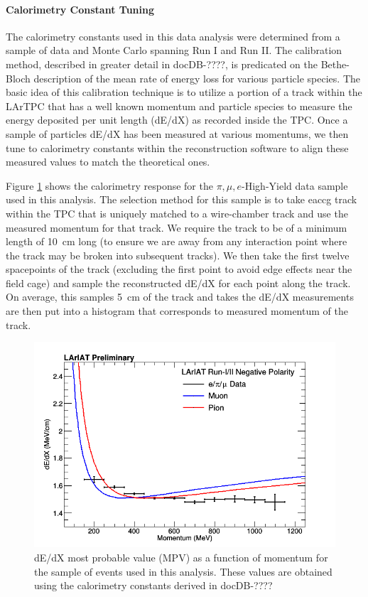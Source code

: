 \paragraph{\textbf{Calorimetry Constant Tuning}}
The calorimetry constants used in this data analysis were determined from a sample of data and Monte Carlo spanning Run I and Run II. The calibration method, described in greater detail in docDB-????, is predicated on the Bethe-Bloch description of the mean rate of energy loss for various particle species. The basic idea of this calibration technique is to utilize a portion of a track within the LArTPC that has a well known momentum and particle species to measure the energy deposited per unit length (dE/dX) as recorded inside the TPC. Once a sample of particles dE/dX has been measured at various momentums, we then tune to calorimetry constants within the reconstruction software to align these measured values to match the theoretical ones.

Figure \ref{fig:dEdXvsMomentum} shows the calorimetry response for the $\pi, \mu, e$-High-Yield data sample used in this analysis. The selection method for this sample is to take eaccg  track within the TPC that is uniquely matched to a wire-chamber track and use the measured momentum for that track. We require the track to be of a minimum length of 10~cm long (to ensure we are away from any interaction point where the track may be broken into subsequent tracks). We then take the first twelve spacepoints of the track (excluding the first point to avoid edge effects near the field cage) and sample the reconstructed dE/dX for each point along the track. On average, this samples 5~cm of the track and takes the dE/dX measurements are then put into a histogram that corresponds to measured momentum of the track.

\begin{figure}[h!]
\centering
\includegraphics[scale=0.35]{./images/dEdXvsMomentumCombined.png}
\caption{dE/dX most probable value (MPV) as a function of momentum for the sample of events used in this analysis. These values are obtained using the calorimetry constants derived in docDB-????}
\label{fig:dEdXvsMomentum}
\end{figure}

